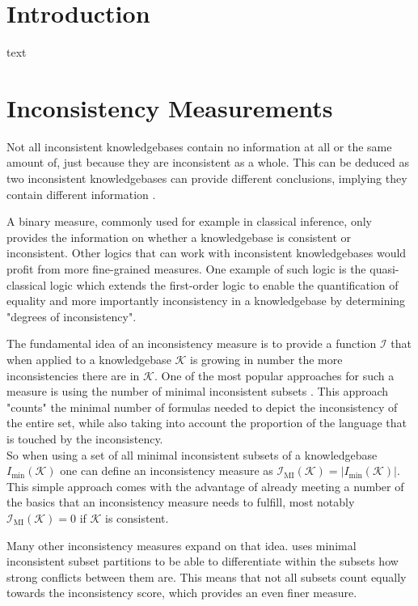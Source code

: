 \section{Introduction}
text

\section{Inconsistency Measurements}
Not all inconsistent knowledgebases contain no information at all or the same amount of, just because they are inconsistent as a whole. This can be deduced as two inconsistent knowledgebases can provide different conclusions, implying they contain different information \cite{bertossi_approaches_2005}.

A binary measure, commonly used for example in classical inference, only provides the information on whether a knowledgebase is consistent or inconsistent. Other logics that can work with inconsistent knowledgebases would profit from more fine-grained measures.
One example of such logic is the quasi-classical logic \cite{grant_measuring_2006} which extends the first-order logic to enable the quantification of equality and more importantly inconsistency in a knowledgebase by determining "degrees of inconsistency".

The fundamental idea of an inconsistency measure is to provide a function \(\mathcal{I}\) that when applied to a knowledgebase \(\mathcal{K}\) is growing in number the more inconsistencies there are in \(\mathcal{K}\). One of the most popular approaches for such a measure is using the number of minimal inconsistent subsets \cite{hunter_measuring_2008}. This approach "counts" the minimal number of formulas needed to depict the inconsistency of the entire set, while also taking into account the proportion of the language that is touched by the inconsistency.\\
So when using a set of all minimal inconsistent subsets of a knowledgebase \(I_{\min}(\mathcal{K})\) one can define an inconsistency measure as \(\mathcal{I}_{\text{MI}}(\mathcal{K}) = \left| I_{\min}(\mathcal{K}) \right|\). This simple approach comes with the advantage of already meeting a number of the basics that an inconsistency measure needs to fulfill, most notably \(\mathcal{I}_{\text{MI}}(\mathcal{K}) = 0\) if \(\mathcal{K}\) is consistent.

Many other inconsistency measures expand on that idea. \cite{jabbour_mis_2016} uses minimal inconsistent subset partitions to be able to differentiate within the subsets how strong conflicts between them are. This means that not all subsets count equally towards the inconsistency score, which provides an even finer measure.

